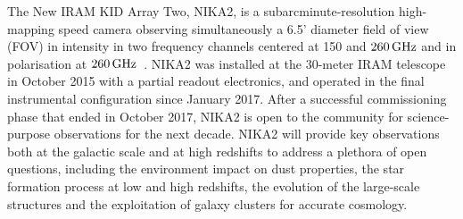 %
%

The New IRAM KID Array Two, NIKA2, is a subarcminute-resolution
high-mapping speed camera observing simultaneously a 6.5' diameter
field of view (FOV) in intensity in two
frequency channels centered at 150 and $260\,\rm{GHz}$ and in
polarisation at $260\, \rm{GHz}$~\citep{Adam2018}. NIKA2 was installed at the
30-meter IRAM telescope in October 2015 with a partial readout
electronics, and operated in the final instrumental configuration since
January 2017. After a successful
commissioning phase that ended in October 2017, NIKA2 is
open to the community for science-purpose observations for the next
decade. NIKA2 will provide key observations both at the galactic scale
and at high redshifts to address a plethora of open questions, including
the environment impact on dust properties, the star formation process
at low and high redshifts, the evolution of the large-scale structures
and the exploitation of galaxy clusters for accurate cosmology.
%
%


